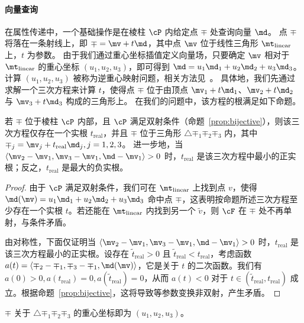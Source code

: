\paragraph{向量查询}
在属性传递中，一个基础操作是在棱柱 $\cP$ 内给定点 $\mp$ 处查询向量 $\md$。
%
点 $\mp$ 将落在一条射线上，即 $\mp = \mv + t \md$，其中点 $\mv$ 位于线性三角形 $\mt_{\text{linear}}$ 上，$t$ 为参数。
%
由于我们通过重心坐标插值定义向量场，只要确定 $\mv$ 相对于 $\mt_{\text{linear}}$ 的重心坐标 $(u_1, u_2, u_3)$，即可得到 $\md = u_1 \md_1+u_2 \md_2+ u_3 \md_3$。
%
计算 $(u_1, u_2, u_3)$ 被称为逆重心映射问题，相关方法见~\cite{Maggiordomo2023TheIB}。
%
具体地，我们先通过求解一个三次方程来计算 $t$，使得点 $\mp$ 位于由顶点 $\mv_1+ t \md_1$、$\mv_2+ t \md_2$ 与 $\mv_3 + t \md_3$ 构成的三角形上。
%
在我们的问题中，该方程的根满足如下命题。
\begin{prop}\label{prop:vector-query}
  若 $\mp$ 位于棱柱 $\cP$ 内部，且 $\cP$ 满足双射条件（命题~\ref{prop:bijective}），则该三次方程仅存在一个实根 $t_\text{real}$，并且 $\mp$ 位于三角形 $\triangle\mp_1\mp_2\mp_3$ 内，其中 $\mp_j = \mv_j + t_\text{real} \md_j, j=1,2,3$。 %
  进一步地，当 $\left\langle\mv_2-\mv_1,\mv_3-\mv_1,\md-\mv_1\right\rangle>0$ 时，$t_\text{real}$ 是该三次方程中最小的正实根；反之，\( t_{\text{real}} \) 是最大的负实根。
\end{prop}
\begin{proof}
由于 $\cP$ 满足双射条件，我们可在 $\mt_{\text{linear}}$ 上找到点 $v$，使得 $\md(\mv) = u_1 \md_1+u_2 \md_2+ u_3 \md_3$ 命中点 $\mp$，这表明按命题所述三次方程至少存在一个实根 $t$。若还能在 $\mt_{\text{linear}}$ 内找到另一个 $\tilde{v}$，则 $\cF$ 在 $\mp$ 处不再单射，与条件矛盾。

由对称性，下面仅证明当 $\left\langle\mv_2-\mv_1,\mv_3-\mv_1,\md-\mv_1\right\rangle>0$ 时，$t_\text{real}$ 是该三次方程最小的正实根。设存在 $\tilde{t}_{\text{real}}>0$ 且 $\tilde{t}_{\text{real}}<t_{\text{real}}$，考虑函数 $a(t)=\left \langle \mp_2-\mp_1,\mp_3-\mp_1,\md(\mv)\right \rangle$，它是关于 $t$ 的二次函数。我们有 $a(0)>0,a(t_{\text{real}})=0,a(\tilde{t}_{\text{real}})=0$，从而 $a(t)<0$ 对于 $t\in (\tilde{t}_{\text{real}},t_{\text{real}})$ 成立。根据命题~\ref{prop:bijective}，这将导致等参数变换非双射，产生矛盾。
\end{proof}
$\mp$ 关于 $\triangle\mp_1\mp_2\mp_3$ 的重心坐标即为 $(u_1, u_2, u_3)$。


